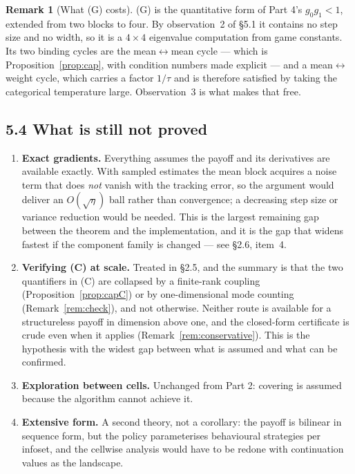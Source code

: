 \documentclass[11pt]{article}
\theoremstyle{definition}
\newtheorem{remark}[theorem]{Remark}
\begin{document}
\begin{remark}[What (G) costs]\label{rem:G}
(G) is the quantitative form of Part 4's $g_0g_1 < 1$, extended from two blocks to
four. By observation~2 of \S5.1 it contains no step size and no width, so it is a
$4\times4$ eigenvalue computation from game constants. Its two binding cycles are
the mean$\leftrightarrow$mean cycle --- which is Proposition~\ref{prop:cap}, with
condition numbers made explicit --- and a mean$\leftrightarrow$weight cycle, which
carries a factor $1/\tau$ and is therefore satisfied by taking the categorical
temperature large. Observation~3 is what makes that free.
\end{remark}

\subsection*{5.4 What is still not proved}

\begin{enumerate}[leftmargin=1.4em]
\item \textbf{Exact gradients.} Everything assumes the payoff and its derivatives
  are available exactly. With sampled estimates the mean block acquires a noise
  term that does \emph{not} vanish with the tracking error, so the argument would
  deliver an $O(\sqrt\eta)$ ball rather than convergence; a decreasing step size
  or variance reduction would be needed. This is the largest remaining gap between
  the theorem and the implementation, and it is the gap that widens fastest if the
  component family is changed --- see \S2.6, item~4.
\item \textbf{Verifying (C) at scale.} Treated in \S2.5, and the summary is that
  the two quantifiers in (C) are collapsed by a finite-rank coupling
  (Proposition~\ref{prop:capC}) or by one-dimensional mode counting
  (Remark~\ref{rem:check}), and not otherwise. Neither route is available for a
  structureless payoff in dimension above one, and the closed-form certificate is
  crude even when it applies (Remark~\ref{rem:conservative}). This is the
  hypothesis with the widest gap between what is assumed and what can be
  confirmed.
\item \textbf{Exploration between cells.} Unchanged from Part 2: covering is
  assumed because the algorithm cannot achieve it.
\item \textbf{Extensive form.} A second theory, not a corollary: the payoff is
  bilinear in sequence form, but the policy parameterises behavioural strategies
  per infoset, and the cellwise analysis would have to be redone with continuation
  values as the landscape.
\end{enumerate}
\end{document}
